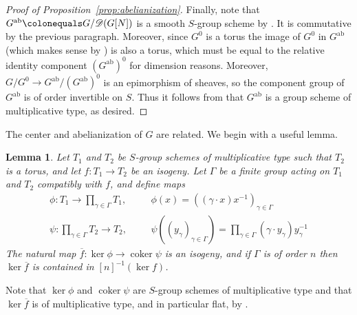 \documentclass[11pt, letterpaper,english]{amsart}
\theoremstyle{plain}
\newtheorem{lemma}[lem]{Lemma}
\theoremstyle{definition}
\numberwithin{equation}{section}
\numberwithin{lem}{section}
\newcommand{\sD}{{\mathscr D}}
\DeclareMathOperator{\coker} {coker}
\begin{document}
\begin{proof}[Proof of Proposition~\ref{prop:abelianization}]
Finally, note that $G^{\mathrm{ab}} \colonequals G/\sD(G[N])$ is a smooth $S$-group scheme by \cite[Exp.\ V, Thm. 4.1]{sga3}. It is commutative by the previous paragraph. Moreover, since $G^0$ is a torus the image of $G^0$ in $G^{\mathrm{ab}}$ (which makes sense by \cite[Exp.\ IX, Thm.\ 6.8]{sga3}) is also a torus, which must be equal to the relative identity component $(G^{\mathrm{ab}})^0$ for dimension reasons. Moreover, $G/G^0 \to G^{\mathrm{ab}}/(G^{\mathrm{ab}})^0$ is an epimorphism of sheaves, so the component group of $G^{\mathrm{ab}}$ is of order invertible on $S$. Thus it follows from \cite[Exp.\ XVII, Prop.\ 7.1.1]{sga3} that $G^{\mathrm{ab}}$ is a group scheme of multiplicative type, as desired.
\end{proof}


The center and abelianization of $G$ are related.  We begin with a useful lemma.

\begin{lemma}\label{lemma:equivariant-isogeny}
Let $T_1$ and $T_2$ be $S$-group schemes of multiplicative type such that $T_2$ is a torus, and let $f: T_1 \to T_2$ be an isogeny. Let $\Gamma$ be a finite group acting on $T_1$ and $T_2$ compatibly with $f$, and define maps
\begin{align*}
    \phi: T_1 \to \prod_{\gamma \in \Gamma} T_1, \,\,\,\,\,\,\,\,\,\, &\phi(x) = ((\gamma \cdot x) x^{-1})_{\gamma \in \Gamma} \\
    \psi: \prod_{\gamma \in \Gamma} T_2 \to T_2, \,\,\,\,\,\,\,\,\,\, &\psi((y_\gamma)_{\gamma \in \Gamma}) = \prod_{\gamma \in \Gamma} (\gamma \cdot y_\gamma) y_\gamma^{-1}
\end{align*}
The natural map $\overline{f}: \ker \phi \to \coker \psi$ is an isogeny, and if $\Gamma$ is of order $n$ then $\ker \overline{f}$ is contained in $[n]^{-1}(\ker f)$.
\end{lemma}

Note that $\ker \phi$ and $\coker \psi$ are $S$-group schemes of multiplicative type and that $\ker \overline{f}$ is of multiplicative type, and in particular flat, by \cite[Exp.\ IX, Thm.\ 6.8]{sga3}.
\end{document}
